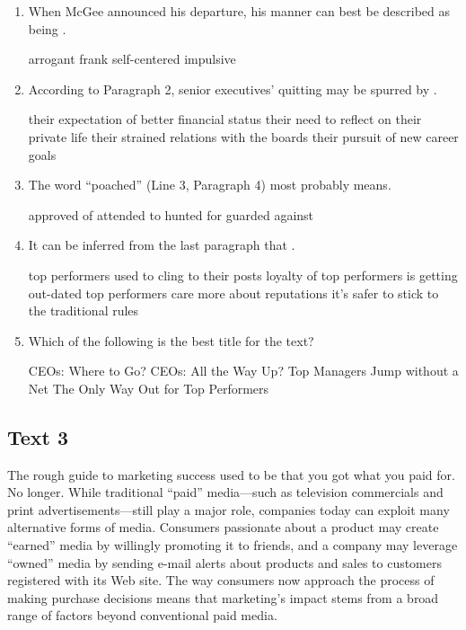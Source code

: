 \begin{enumerate}[resume]
	\item
 When McGee announced his departure, his manner can
best be described as being \lineread.


\fourchoices
{arrogant}
{frank}
{self-centered}
{impulsive}



\item
According to Paragraph 2, senior executives'
quitting may be spurred by \lineread.


\fourchoices
{their expectation of better financial status}
{their need to reflect on their private life}
{their strained relations with the boards}
{their pursuit of new career goals}



\item
The word ``poached'' (Line 3, Paragraph 4) most
probably means\lineread.


\fourchoices
{approved of}
{attended to}
{hunted for}
{guarded against}


\item
 It can be inferred from the last paragraph that \lineread.

\fourchoices
{top performers used to cling to their posts}
{loyalty of top performers is getting out-dated}
{top performers care more about reputations}
{it's safer to stick to the traditional rules}


\item
Which of the following is the best title for the
text?


\fourchoices
{CEOs: Where to Go?}
{CEOs: All the Way Up?}
{Top Managers Jump without a Net}
{The Only Way Out for Top Performers}


\end{enumerate}


\newpage
\subsection{Text 3}


The rough guide to marketing success used to be that you got what you
paid for. No longer. While traditional ``paid'' media---such as
television commercials and print advertisements---still play a major
role, companies today can exploit many alternative forms of media.
Consumers passionate about a product may create ``earned'' media by
willingly promoting it to friends, and a company may leverage ``owned''
media by sending e-mail alerts about products and sales to customers
registered with its Web site. The way consumers now approach the process
of making purchase decisions means that marketing's impact stems from a
broad range of factors beyond conventional paid media.

